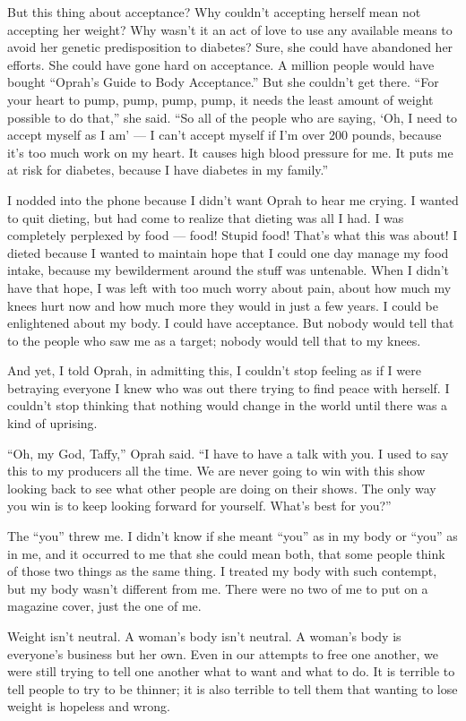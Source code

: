But this thing about acceptance? Why couldn't accepting herself mean not
accepting her weight? Why wasn't it an act of love to use any available
means to avoid her genetic predisposition to diabetes? Sure, she could
have abandoned her efforts. She could have gone hard on acceptance. A
million people would have bought ``Oprah's Guide to Body Acceptance.''
But she couldn't get there. ``For your heart to pump, pump, pump, pump,
it needs the least amount of weight possible to do that,'' she said.
``So all of the people who are saying, `Oh, I need to accept myself as I
am' --- I can't accept myself if I'm over 200 pounds, because it's too
much work on my heart. It causes high blood pressure for me. It puts me
at risk for diabetes, because I have diabetes in my family.''

I nodded into the phone because I didn't want Oprah to hear me crying. I
wanted to quit dieting, but had come to realize that dieting was all I
had. I was completely perplexed by food --- food! Stupid food! That's
what this was about! I dieted because I wanted to maintain hope that I
could one day manage my food intake, because my bewilderment around the
stuff was untenable. When I didn't have that hope, I was left with too
much worry about pain, about how much my knees hurt now and how much
more they would in just a few years. I could be enlightened about my
body. I could have acceptance. But nobody would tell that to the people
who saw me as a target; nobody would tell that to my knees.

And yet, I told Oprah, in admitting this, I couldn't stop feeling as if
I were betraying everyone I knew who was out there trying to find peace
with herself. I couldn't stop thinking that nothing would change in the
world until there was a kind of uprising.

``Oh, my God, Taffy,'' Oprah said. ``I have to have a talk with you. I
used to say this to my producers all the time. We are never going to win
with this show looking back to see what other people are doing on their
shows. The only way you win is to keep looking forward for yourself.
What's best for you?''

The ``you'' threw me. I didn't know if she meant ``you'' as in my body
or ``you'' as in me, and it occurred to me that she could mean both,
that some people think of those two things as the same thing. I treated
my body with such contempt, but my body wasn't different from me. There
were no two of me to put on a magazine cover, just the one of me.

Weight isn't neutral. A woman's body isn't neutral. A woman's body is
everyone's business but her own. Even in our attempts to free one
another, we were still trying to tell one another what to want and what
to do. It is terrible to tell people to try to be thinner; it is also
terrible to tell them that wanting to lose weight is hopeless and wrong.

